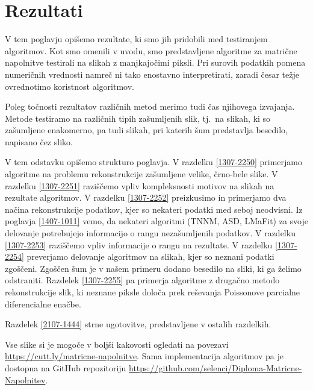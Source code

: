 \chapter{Rezultati}\label{1407-1012}

V tem poglavju opišemo rezultate, ki smo jih pridobili med testiranjem algoritmov. Kot smo omenili v uvodu, smo predstavljene algoritme za matrične napolnitve testirali na slikah z manjkajočimi piksli. 
Pri surovih podatkih pomena numeričnih vrednosti namreč ni tako enostavno interpretirati, zaradi česar težje ovrednotimo koristnost algoritmov.

Poleg točnosti rezultatov različnih metod merimo tudi čas njihovega izvajanja. Metode testiramo na različnih tipih zašumljenih slik, tj.\ na slikah, ki so zašumljene enakomerno, pa tudi slikah, pri katerih šum predstavlja besedilo, napisano čez sliko.

V tem odstavku opišemo strukturo poglavja.
V razdelku \ref{1307-2250} primerjamo algoritme na problemu rekonstrukcije zašumljene velike, črno-bele slike. V razdelku \ref{1307-2251} raziščemo vpliv kompleksnosti motivov na slikah na rezultate algoritmov. V razdelku \ref{1307-2252} preizkusimo in primerjamo dva načina rekonstrukcije podatkov, kjer so nekateri podatki med seboj neodvisni. Iz poglavja \ref{1407-1011} vemo, da nekateri algoritmi (TNNM, ASD, LMaFit) za svoje delovanje potrebujejo informacijo o rangu nezašumljenih podatkov. V razdelku \ref{1307-2253} raziščemo vpliv informacije o rangu na rezultate. V razdelku \ref{1307-2254} preverjamo delovanje algoritmov na slikah, kjer so neznani podatki zgoščeni.
Zgoščen šum je v našem primeru dodano besedilo na sliki, ki ga želimo odstraniti. Razdelek \ref{1307-2255} pa primerja algoritme z drugačno metodo rekonstrukcije slik, ki neznane piksle določa prek reševanja Poissonove parcialne diferencialne enačbe. 

Razdelek \ref{2107-1444} strne ugotovitve, predstavljene v ostalih razdelkih.


Vse slike si je mogoče v boljši kakovosti ogledati na povezavi \url{https://cutt.ly/matricne-napolnitve}. Sama implementacija algoritmov pa je dostopna na GitHub repozitoriju \url{https://github.com/selenci/Diploma-Matricne-Napolnitev}.

